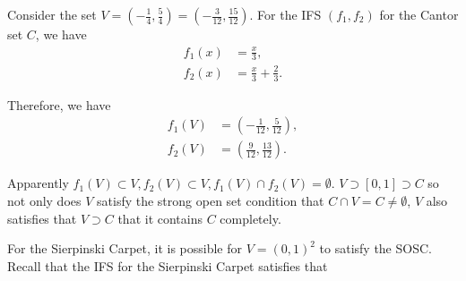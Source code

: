 Consider the set \(V = \left(-\frac{1}{4}, \frac{5}{4}\right) = \left(-\frac{3}{12}, \frac{15}{12}\right)\). For the IFS \((f_1, f_2)\) for the Cantor set \(C\), we have
\begin{align*}
    f_1(x) &= \frac{x}{3},\\
    f_2(x) &= \frac{x}{3} + \frac{2}{3}.
\end{align*}

Therefore, we have
\begin{align*}
    f_1(V) &= \left(-\frac{1}{12}, \frac{5}{12}\right),\\
    f_2(V) &= \left(\frac{9}{12}, \frac{13}{12}\right).
\end{align*}

Apparently \(f_1(V) \subset V, f_2(V) \subset V, f_1(V) \cap f_2(V) = \emptyset\). \(V \supset [0, 1] \supset C\) so not only does \(V\) satisfy the strong open set condition that \(C \cap V = C \neq \emptyset\), \(V\) also satisfies that \(V \supset C\) that it contains \(C\) completely.

For the Sierpinski Carpet, it is possible for \(V = (0, 1)^2\) to satisfy the SOSC. Recall that the IFS for the Sierpinski Carpet satisfies that

